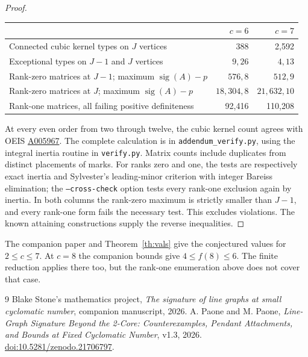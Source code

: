 \documentclass[11pt]{article}
\newcommand{\sg}{\operatorname{sig}}
\begin{document}
\begin{proof}
\begin{center}
\begin{tabular}{lrr}
 & $c=6$ & $c=7$\\\hline
Connected cubic kernel types on $J$ vertices & 388 & 2,592\\
Exceptional types on $J-1$ and $J$ vertices & $9,26$ & $4,13$\\
Rank-zero matrices at $J-1$; maximum $\sg(A)-p$ & $576,8$ & $512,9$\\
Rank-zero matrices at $J$; maximum $\sg(A)-p$ & $18{,}304,8$ & $21{,}632,10$\\
Rank-one matrices, all failing positive definiteness & 92,416 & 110,208
\end{tabular}
\end{center}
At every even order from two through twelve, the cubic kernel count agrees with OEIS \href{https://oeis.org/A005967}{A005967}. The complete calculation is in \texttt{addendum\_verify.py}, using the integral inertia routine in \texttt{verify.py}. Matrix counts include duplicates from distinct placements of marks. For ranks zero and one, the tests are respectively exact inertia and Sylvester's leading-minor criterion with integer Bareiss elimination; the \texttt{--cross-check} option tests every rank-one exclusion again by inertia. In both columns the rank-zero maximum is strictly smaller than $J-1$, and every rank-one form fails the necessary test. This excludes violations. The known attaining constructions \cite[Theorem 5.3]{pp} supply the reverse inequalities.
\end{proof}

The companion paper and Theorem~\ref{th:vals} give the conjectured values for $2\le c\le7$. At $c=8$ the companion bounds give $4\le f(8)\le6$. The finite reduction applies there too, but the rank-one enumeration above does not cover that case.
\begin{thebibliography}{9}
 Blake Stone's mathematics project, \emph{The signature of line graphs at small cyclomatic number}, companion manuscript, 2026.
 A. Paone and M. Paone, \emph{Line-Graph Signature Beyond the 2-Core: Counterexamples, Pendant Attachments, and Bounds at Fixed Cyclomatic Number}, v1.3, 2026. \href{https://doi.org/10.5281/zenodo.21706797}{doi:10.5281/zenodo.21706797}.
\end{thebibliography}
\end{document}

